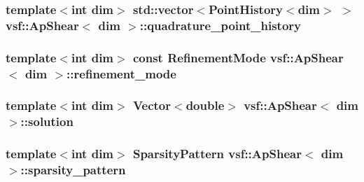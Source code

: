 \hypertarget{classvsf_1_1ApShear_aeb702a26aef2b0a7d0d27d46909b81b9}{
\subsubsection[{quadrature\-\_\-point\-\_\-history}]{\setlength{\rightskip}{0pt plus 5cm}template$<$int dim$>$ std\-::vector$<${\bf Point\-History}$<$dim$>$ $>$ {\bf vsf\-::\-Ap\-Shear}$<$ dim $>$\-::quadrature\-\_\-point\-\_\-history\hspace{0.3cm}{\ttfamily [private]}}}\label{classvsf_1_1ApShear_aeb702a26aef2b0a7d0d27d46909b81b9}
\hypertarget{classvsf_1_1ApShear_a523d3e34e242a9dbcf1d727dc17874b6}{
\subsubsection[{refinement\-\_\-mode}]{\setlength{\rightskip}{0pt plus 5cm}template$<$int dim$>$ const {\bf Refinement\-Mode} {\bf vsf\-::\-Ap\-Shear}$<$ dim $>$\-::refinement\-\_\-mode\hspace{0.3cm}{\ttfamily [private]}}}\label{classvsf_1_1ApShear_a523d3e34e242a9dbcf1d727dc17874b6}
\hypertarget{classvsf_1_1ApShear_ae4ee8cb26cbb92aa25fa91d2eb2198db}{
\subsubsection[{solution}]{\setlength{\rightskip}{0pt plus 5cm}template$<$int dim$>$ Vector$<$double$>$ {\bf vsf\-::\-Ap\-Shear}$<$ dim $>$\-::solution\hspace{0.3cm}{\ttfamily [private]}}}\label{classvsf_1_1ApShear_ae4ee8cb26cbb92aa25fa91d2eb2198db}
\hypertarget{classvsf_1_1ApShear_a065cb85ed84df073fd1b726667eebcc3}{
\subsubsection[{sparsity\-\_\-pattern}]{\setlength{\rightskip}{0pt plus 5cm}template$<$int dim$>$ Sparsity\-Pattern {\bf vsf\-::\-Ap\-Shear}$<$ dim $>$\-::sparsity\-\_\-pattern\hspace{0.3cm}{\ttfamily [private]}}}\label{classvsf_1_1ApShear_a065cb85ed84df073fd1b726667eebcc3}

